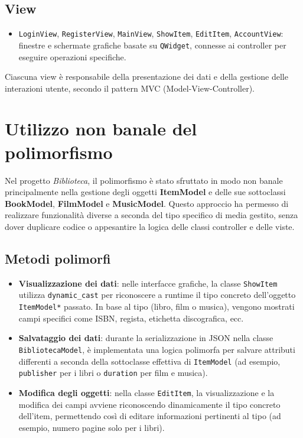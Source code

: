 \documentclass[a4paper,10pt]{article}
\begin{document}
\subsection{View}
\begin{itemize}
    \item \texttt{LoginView}, \texttt{RegisterView}, \texttt{MainView}, \texttt{ShowItem}, \texttt{EditItem}, \texttt{AccountView}: finestre e schermate grafiche basate su \texttt{QWidget}, connesse ai controller per eseguire operazioni specifiche.
\end{itemize}
Ciascuna view \`e responsabile della presentazione dei dati e della gestione delle interazioni utente, secondo il pattern MVC (Model-View-Controller).



\section{Utilizzo non banale del polimorfismo}

Nel progetto \textit{Biblioteca}, il polimorfismo \`e stato sfruttato in modo non banale principalmente nella gestione degli oggetti \textbf{ItemModel} e delle sue sottoclassi \textbf{BookModel}, \textbf{FilmModel} e \textbf{MusicModel}. Questo approccio ha permesso di realizzare funzionalit\`a diverse a seconda del tipo specifico di media gestito, senza dover duplicare codice o appesantire la logica delle classi controller e delle viste.

\subsection{Metodi polimorfi}

\begin{itemize}
    \item \textbf{Visualizzazione dei dati}: nelle interfacce grafiche, la classe \texttt{ShowItem} utilizza \texttt{dynamic\_cast} per riconoscere a runtime il tipo concreto dell'oggetto \texttt{ItemModel*} passato. In base al tipo (libro, film o musica), vengono mostrati campi specifici come ISBN, regista, etichetta discografica, ecc.
    \item \textbf{Salvataggio dei dati}: durante la serializzazione in JSON nella classe \texttt{BibliotecaModel}, \`e implementata una logica polimorfa per salvare attributi differenti a seconda della sottoclasse effettiva di \texttt{ItemModel} (ad esempio, \texttt{publisher} per i libri o \texttt{duration} per film e musica).
    \item \textbf{Modifica degli oggetti}: nella classe \texttt{EditItem}, la visualizzazione e la modifica dei campi avviene riconoscendo dinamicamente il tipo concreto dell'item, permettendo cos\`i di editare informazioni pertinenti al tipo (ad esempio, numero pagine solo per i libri).
\end{itemize}
\end{document}
